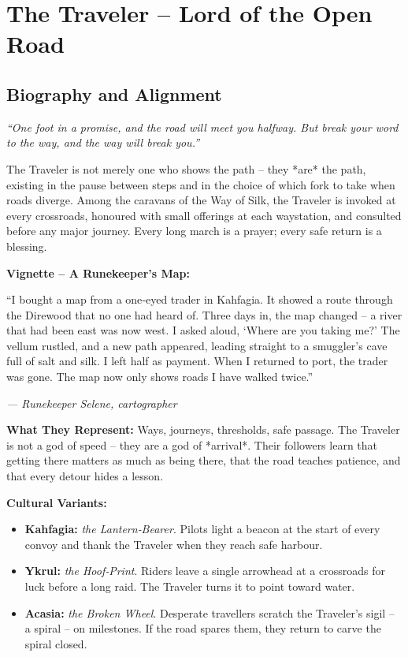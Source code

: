 \documentclass[10pt,a5paper]{book}
\begin{document}
\section{The Traveler – Lord of the Open Road}
\label{patron:traveler}

\subsection*{Biography and Alignment}

\textit{“One foot in a promise, and the road will meet you halfway. But break your word to the way, and the way will break you.”}

The Traveler is not merely one who shows the path – they *are* the path, existing in the pause between steps and in the choice of which fork to take when roads diverge. Among the caravans of the Way of Silk, the Traveler is invoked at every crossroads, honoured with small offerings at each waystation, and consulted before any major journey. Every long march is a prayer; every safe return is a blessing.

\textbf{Vignette – A Runekeeper’s Map:}
\epigraph{“I bought a map from a one‑eyed trader in Kahfagia. It showed a route through the Direwood that no one had heard of. Three days in, the map changed – a river that had been east was now west. I asked aloud, ‘Where are you taking me?’ The vellum rustled, and a new path appeared, leading straight to a smuggler’s cave full of salt and silk. I left half as payment. When I returned to port, the trader was gone. The map now only shows roads I have walked twice.”}{\textit{— Runekeeper Selene, cartographer}}

\textbf{What They Represent:} Ways, journeys, thresholds, safe passage. The Traveler is not a god of speed – they are a god of *arrival*. Their followers learn that getting there matters as much as being there, that the road teaches patience, and that every detour hides a lesson.

\textbf{Cultural Variants:}
\begin{itemize}
    \item \textbf{Kahfagia:} \textit{the Lantern‑Bearer}. Pilots light a beacon at the start of every convoy and thank the Traveler when they reach safe harbour.
    \item \textbf{Ykrul:} \textit{the Hoof‑Print}. Riders leave a single arrowhead at a crossroads for luck before a long raid. The Traveler turns it to point toward water.
    \item \textbf{Acasia:} \textit{the Broken Wheel}. Desperate travellers scratch the Traveler’s sigil – a spiral – on milestones. If the road spares them, they return to carve the spiral closed.
\end{itemize}
\end{document}

